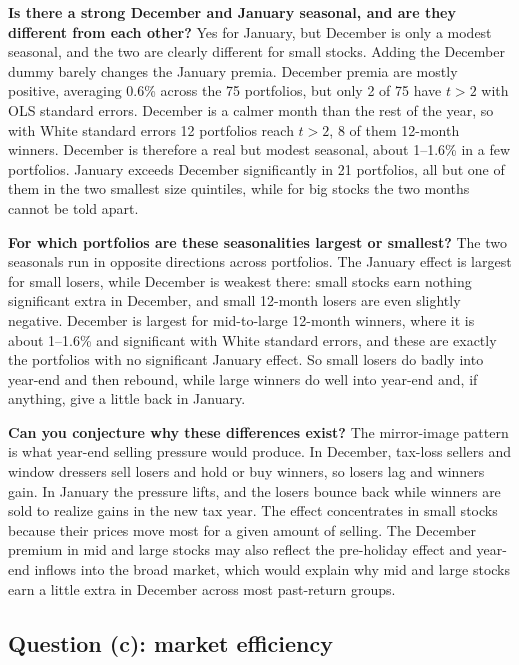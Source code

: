 \begin{tight}
  \item \textbf{Is there a strong December and January seasonal, and are they different from
  each other?} Yes for January, but December is only a modest seasonal, and the two are
  clearly different for small stocks. Adding the December dummy barely changes the January
  premia. December premia are mostly positive, averaging 0.6\% across the 75 portfolios, but
  only 2 of 75 have $t>2$ with OLS standard errors. December is a calmer month than the rest of
  the year, so with White standard errors 12 portfolios reach $t>2$, 8 of them 12-month winners.
  December is therefore a real but modest seasonal, about 1--1.6\% in a few portfolios. January exceeds December significantly in 21 portfolios, all but one of them in
  the two smallest size quintiles, while for big stocks the two months cannot be told apart.

  \item \textbf{For which portfolios are these seasonalities largest or smallest?} The two
  seasonals run in opposite directions across portfolios. The January effect is largest for
  small losers, while December is weakest there: small stocks earn nothing significant extra in December,
  and small 12-month losers are even slightly negative. December is largest for mid-to-large
  12-month winners, where it is about 1--1.6\% and significant with White standard errors, and these are
  exactly the portfolios with no significant January effect. So small losers do badly into year-end and then rebound,
  while large winners do well into year-end and, if anything, give a little back in January.

  \item \textbf{Can you conjecture why these differences exist?} The mirror-image pattern is
  what year-end selling pressure would produce. In December, tax-loss sellers and window
  dressers sell losers and hold or buy winners, so losers lag and winners gain. In January the
  pressure lifts, and the losers bounce back while winners are sold to realize gains in the new
  tax year. The effect concentrates in small stocks because their prices move most for a given
  amount of selling. The December premium in mid and large stocks may also reflect the
  pre-holiday effect and year-end inflows into the broad market, which would explain why mid
  and large stocks earn a little extra in December across most past-return groups.
\end{tight}

\subsection*{Question (c): market efficiency}

